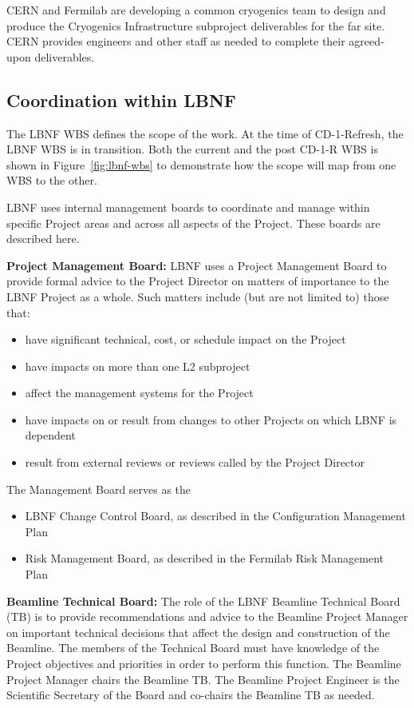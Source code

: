 CERN and Fermilab are developing a common cryogenics team to design and produce the Cryogenics Infrastructure subproject deliverables for the far site. CERN provides engineers and other staff as needed to complete their agreed-upon deliverables.
 
\subsection{Coordination within LBNF}
 
The LBNF WBS defines the scope of the work. At the time of CD-1-Refresh, the LBNF WBS is in transition. Both the current and the post CD-1-R WBS is shown in Figure~\ref{fig:lbnf-wbs} to demonstrate how the scope will map from one WBS to the other.
 
LBNF uses internal management boards to coordinate and manage within specific Project areas and across all aspects of the Project. These boards are described here.
 
 
\textbf{Project Management Board:} LBNF uses a Project Management Board to provide formal advice to the Project Director on matters of importance to the LBNF Project as a whole. Such matters include (but are not limited to) those that:
\begin{itemize}
\item have significant technical, cost, or schedule impact on the Project
\item have impacts on more than one L2 subproject
\item affect the management systems for the Project
\item have impacts on or result from changes to other Projects on which LBNF is dependent
\item result from external reviews or reviews called by the Project Director
\end{itemize}
The Management Board serves as the
\begin{itemize}
\item LBNF Change Control Board, as described in the Configuration Management Plan \fixme{[ref]}
\item Risk Management Board, as described in the Fermilab Risk Management Plan \fixme{[ref]}
\end{itemize}
 
\textbf{Beamline Technical Board:} The role of the LBNF Beamline Technical Board (TB) is to provide recommendations and advice to the Beamline Project Manager on important technical decisions that affect the design and construction of the Beamline. The members of the Technical Board must have knowledge of the Project objectives and priorities in order to perform this function. The Beamline Project Manager chairs the Beamline TB. The Beamline Project Engineer is the Scientific Secretary of the Board and co-chairs the Beamline TB as needed.
 
